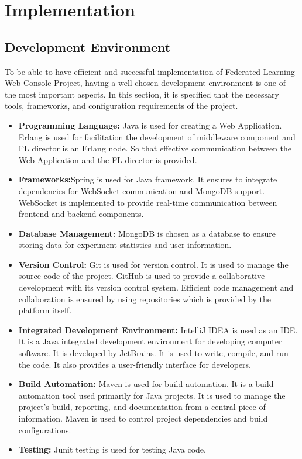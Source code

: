 \chapter{Implementation}

\section{Development Environment}

To be able to have efficient and successful implementation of Federated Learning Web Console Project, having a well-chosen development environment is one of the
most important aspects. In this section, it is specified that the necessary tools, frameworks, and configuration requirements of the project. \\
\begin{itemize}
    \item \textbf{Programming Language:} Java is used for creating a Web Application. Erlang is used for facilitation the development of middleware component and FL director is an Erlang node.
          So that effective communication between the Web Application and the FL director is provided.
    \item \textbf{Frameworks:}Spring is used for Java framework. It ensures to integrate dependencies for WebSocket communication and MongoDB support.
          WebSocket is implemented to provide real-time communication between frontend and backend components.
    \item \textbf{Database Management:} MongoDB is chosen as a database to ensure storing data for experiment statistics and user information.
    \item \textbf{Version Control:} Git is used for version control. It is used to manage the source code of the project. GitHub is used to provide a collaborative development with its version control system. Efficient code management and collaboration is ensured by using repositories which is provided by the platform itself.
    \item \textbf{Integrated Development Environment:} IntelliJ IDEA is used as an IDE. It is a Java integrated development environment for developing computer software. It is developed by JetBrains. It is used to write, compile, and run the code. It also provides a user-friendly interface for developers.
    \item \textbf{Build Automation:} Maven is used for build automation. It is a build automation tool used primarily for Java projects. It is used to manage the project's build, reporting, and documentation from a central piece of information. Maven is used to control project dependencies and build configurations.
    \item \textbf{Testing: } Junit testing is used for testing Java code.
\end{itemize}


